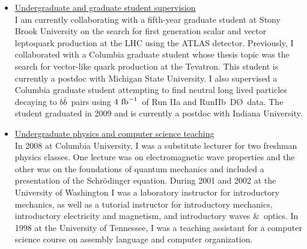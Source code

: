 \documentclass[12pt]{article}
\newcommand{\dzero}{D\O}
\begin{document}
\begin{singlespace}
\begin{itemize}
\item{\underline{Undergraduate and graduate student supervision}\\ I am currently collaborating with a fifth-year graduate student at Stony Brook University on the search for first generation scalar and vector leptoquark production at the LHC using the ATLAS detector. Previously, I collaborated with a Columbia graduate student whose thesis topic was the search for vector-like quark production at the Tevatron. This student is currently a postdoc with Michigan State University. I also supervised a Columbia graduate student attempting to find neutral long lived particles decaying to $b\bar{b}$~pairs using $4~\rm{fb}^{-1}$~of Run IIa and RunIIb~\dzero~data. The student graduated in 2009 and is currently a postdoc with Indiana University.}

\item{\underline{Undergraduate physics and computer science teaching} \\ In 2008 at Columbia University, I was a substitute lecturer for two freshman physics classes. One lecture was on electromagnetic wave properties and the other was on the foundations of quantum mechanics and included a presentation of the Schr\"odinger equation. During 2001 and 2002 at the University of Washington I was a laboratory instructor for introductory mechanics, as well as a tutorial instructor for introductory mechanics, introductory electricity and magnetism, and introductory waves $\&$~optics. In 1998 at the University of Tennessee, I was a teaching assistant for a computer science course on assembly language and computer organization.}

\end{itemize}




\end{singlespace}
\end{document}
